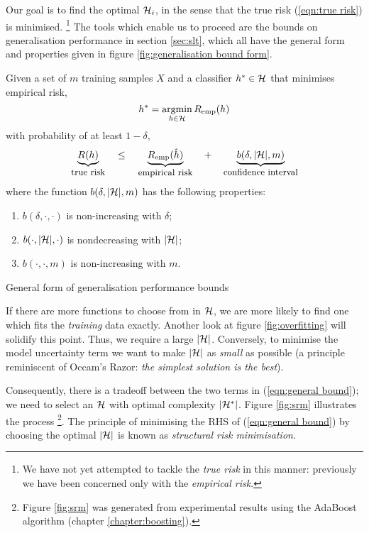 Our goal is to find the optimal $\mathcal{H}_i$, in the sense that the
true risk (\ref{eqn:true risk}) is minimised.
\footnote{We have not yet attempted to tackle the \emph{true risk} in
this manner: previously we have been concerned only with the
\emph{empirical risk}.}
The tools which enable us to proceed are the bounds on generalisation
performance in section \ref{sec:slt}, which all have the general form
and properties given in figure \ref{fig:generalisation bound form}.

\begin{linefigure}
Given a set of $m$ training samples $X$ and a classifier $h^{\ast} \in
\mathcal{H}$ that minimises empirical risk,
\begin{equation*}
h^{\ast} = \argmin_{h \in
\calH} R_{\emp}(h)
\end{equation*}
with probability of at least $1 - \delta$,
%
\begin{equation}
\underbrace{R(h)}_{\mbox{\small{true risk}}}
\quad \leq \quad
\underbrace{R_{\mathrm{emp}}(\hat{h})}_{\mbox{\small{empirical risk}}}
\quad + \quad
\underbrace{b(\delta, |\mathcal{H}|, m)}_{\mbox{\small{confidence interval}}}
\label{eqn:general bound}
\end{equation}
%
where the function $b(\delta, |\mathcal{H}|, m)$ has the following
properties:
%
\begin{enumerate}
\item	$b(\delta, \cdot, \cdot)$ is non-increasing with $\delta$;
\item	$b(\cdot, |\mathcal{H}|, \cdot)$ is nondecreasing with $|\mathcal{H}|$;
\item	$b(\cdot, \cdot, m)$ is non-increasing with $m$.
\end{enumerate}
\caption{General form of generalisation performance bounds}
\label{fig:generalisation bound form}
\end{linefigure}

If there are more functions to choose from in $\mathcal{H}$, we
are more likely to find one which fits the \emph{training} data
exactly.  Another look at figure \ref{fig:overfitting} will solidify
this point.  Thus, we require a large $|\mathcal{H}|$.  Conversely,
to minimise the model uncertainty term we want to make $|\mathcal{H}|$ as
\emph{small} as possible (a principle reminiscent of Occam's Razor:
\emph{the simplest solution is the best}).

Consequently, there is a tradeoff between the two terms in
(\ref{eqn:general bound}); we need to select an $\mathcal{H}$ with optimal
complexity $|\mathcal{H}^{\ast}|$. Figure \ref{fig:srm} illustrates the
process%
\footnote{Figure \ref{fig:srm} was generated from experimental results
using the AdaBoost algorithm (chapter \ref{chapter:boosting}).}.
The principle of minimising the RHS of (\ref{eqn:general bound}) by
choosing the optimal $|\mathcal{H}|$ is known as \emph{structural risk
minimisation}.

